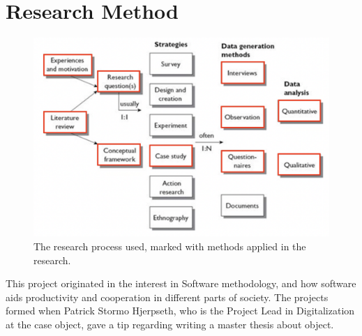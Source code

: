 \section*{Research Method}

\begin{figure}
    \includegraphics[scale=0.23]{empirisk_studie.png}
    \caption{The research process used, marked with methods applied in the research.}
    \label{fig:my_label}
\end{figure}

This project originated in the interest in Software methodology, and how software aids productivity and cooperation in different parts of society. The projects formed when Patrick Stormo Hjerpseth, who is the Project Lead in Digitalization at the case object, gave a tip regarding writing a master thesis about object.

